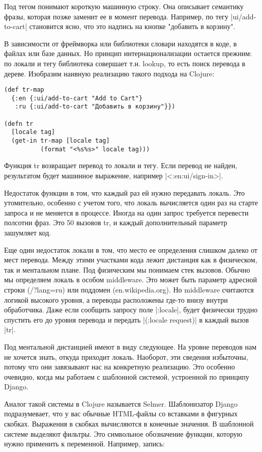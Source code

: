 Под тегом понимают короткую машинную строку. Она описывает семантику фразы,
которая позже заменит ее в момент перевода. Например, по тегу \spverb|ui/add-to-cart|
становится ясно, что это надпись на кнопке "добавить в корзину".

В зависимости от фреймворка или библиотеки словари находятся в коде, в файлах
или базе данных. Но принцип интернационализации остается прежним: по локали и
тегу библиотека совершает т.н. lookup, то есть поиск перевода в
дереве. Изобразим наивную реализацию такого подхода на Clojure:

\begin{verbatim}
(def tr-map
  {:en {:ui/add-to-cart "Add to Cart"}
   :ru {:ui/add-to-cart "Добавить в корзину"}})

(defn tr
  [locale tag]
  (get-in tr-map [locale tag]
          (format "<%s%s>" locale tag)))
\end{verbatim}

Функция tr возвращает перевод то локали и тегу. Если перевод не найден,
результатом будет машинное выражение, например \spverb|<:en:ui/sign-in>|.

Недостаток функции в том, что каждый раз ей нужно передавать локаль. Это
утомительно, особенно с учетом того, что локаль вычисляется один раз на старте
запроса и не меняется в процессе. Иногда на один запрос требуется перевести
полсотни фраз. Это 50 вызовов tr, и каждый дополнительный параметр зашумляет
код.

Еще один недостаток локали в том, что место ее определения слишком далеко от
мест перевода. Между этими участками кода лежит дистанция как в физическом, так
и ментальном плане. Под физическим мы понимаем стек вызовов. Обычно мы
определяем локаль в особом middleware. Это может быть параметр адресной строки
(/?lang=ru) или поддомен (en.wikipedia.org). Но middleware считаются логикой
высокого уровня, а переводы расположены где-то внизу внутри обработчика. Даже
если сообщить запросу поле \spverb|:locale|, будет физически трудно спустить его до
уровня перевода и передать \spverb|(:locale request)| в каждый вызов \spverb|tr|.

Под ментальной дистанцией имеют в виду следующее. На уровне переводов нам не
хочется знать, откуда приходит локаль. Наоборот, эти сведения избыточны, потому
что они завязывают нас на конкретную реализацию. Это особенно очевидно, когда мы
работаем с шаблонной системой, устроенной по принципу Django.

Аналог такой системы в Clojure называется Selmer. Шаблонизатор Django
подразумевает, что у вас обычные HTML-файлы со вставками в фигурных
скобках. Выражения в скобках вычисляются в конечные значения. В шаблонной
системе выделяют фильтры. Это символьное обозначение функции, которую нужно
применить к переменной. Например, запись:

